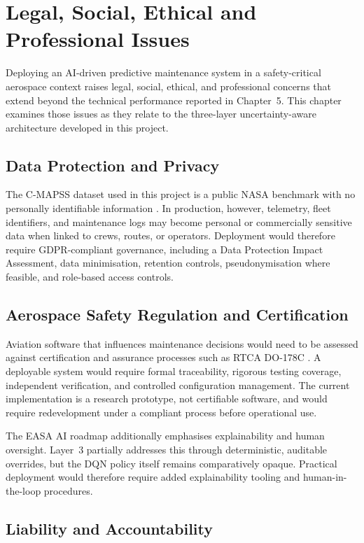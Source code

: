 \documentclass[12pt,a4paper]{report}
\begin{document}
\chapter{Legal, Social, Ethical and Professional Issues}

Deploying an AI-driven predictive maintenance system in a safety-critical aerospace context raises legal, social, ethical, and professional concerns that extend beyond the technical performance reported in Chapter~5. This chapter examines those issues as they relate to the three-layer uncertainty-aware architecture developed in this project.

\section{Data Protection and Privacy}

The C-MAPSS dataset used in this project is a public NASA benchmark with no personally identifiable information \citep{saxena2008damage}. In production, however, telemetry, fleet identifiers, and maintenance logs may become personal or commercially sensitive data when linked to crews, routes, or operators. Deployment would therefore require GDPR-compliant governance, including a Data Protection Impact Assessment, data minimisation, retention controls, pseudonymisation where feasible, and role-based access controls.

\section{Aerospace Safety Regulation and Certification}

Aviation software that influences maintenance decisions would need to be assessed against certification and assurance processes such as RTCA DO-178C \citep{do178c}. A deployable system would require formal traceability, rigorous testing coverage, independent verification, and controlled configuration management. The current implementation is a research prototype, not certifiable software, and would require redevelopment under a compliant process before operational use.

The EASA AI roadmap additionally emphasises explainability and human oversight. Layer~3 partially addresses this through deterministic, auditable overrides, but the DQN policy itself remains comparatively opaque. Practical deployment would therefore require added explainability tooling and human-in-the-loop procedures.

\section{Liability and Accountability}
\end{document}
